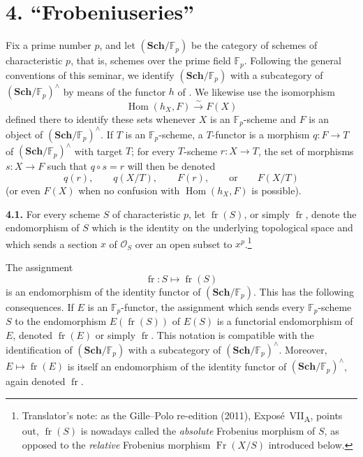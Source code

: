 
\section*{4. ``Frobeniuseries''}
\label{sga3:VIIA:4}

Fix a prime number \(p\), and let
\((\mathbf{Sch}/\mathbb F_p)\) be the category of schemes of
characteristic \(p\), that is, schemes over the prime field
\(\mathbb F_p\). Following the general conventions of this seminar,
we identify \((\mathbf{Sch}/\mathbb F_p)\) with a subcategory of
\((\mathbf{Sch}/\mathbb F_p)^\wedge\) by means of the functor \(h\)
of . We likewise use the isomorphism
\[
  \operatorname{Hom}(h_X,F)\xrightarrow{\sim}F(X)
\]
defined there to identify these sets whenever \(X\) is an
\(\mathbb F_p\)-scheme and \(F\) is an object of
\((\mathbf{Sch}/\mathbb F_p)^\wedge\). If \(T\) is an
\(\mathbb F_p\)-scheme, a \(T\)-functor is a morphism \(q:F\to T\) of
\((\mathbf{Sch}/\mathbb F_p)^\wedge\) with target \(T\); for every
\(T\)-scheme \(r:X\to T\), the set of morphisms \(s:X\to F\) such that
\(q\circ s=r\) will then be denoted
\[
  q(r),\qquad q(X/T),\qquad F(r),\qquad\text{or}\qquad F(X/T)
\]
(or even \(F(X)\) when no confusion with \(\operatorname{Hom}(h_X,F)\) is
possible).

\medskip
\noindent\textbf{4.1.}
\label{sga3:VIIA:4.1}
For every scheme \(S\) of characteristic \(p\), let
\(\operatorname{fr}(S)\), or simply \(\operatorname{fr}\), denote the
endomorphism of \(S\) which is the identity on the underlying
topological space and which sends a section \(x\) of \(\mathcal O_S\)
over an open subset to \(x^p\).\footnote{Translator's note: as the
Gille--Polo re-edition (2011), Expos\'e~VII\textsubscript{A}, points out,
\(\operatorname{fr}(S)\) is nowadays called the \emph{absolute} Frobenius
morphism of \(S\), as opposed to the \emph{relative} Frobenius morphism
\(\operatorname{Fr}(X/S)\) introduced below.}

The assignment
\[
  \operatorname{fr}:S\longmapsto\operatorname{fr}(S)
\]
is an endomorphism of the identity functor of
\((\mathbf{Sch}/\mathbb F_p)\).
This has the following consequences. If \(E\) is an
\(\mathbb F_p\)-functor, the assignment which sends every
\(\mathbb F_p\)-scheme \(S\) to the endomorphism
\(E(\operatorname{fr}(S))\) of \(E(S)\) is a functorial endomorphism
of \(E\), denoted \(\operatorname{fr}(E)\) or simply
\(\operatorname{fr}\). This notation is compatible with the
identification of \((\mathbf{Sch}/\mathbb F_p)\) with a subcategory
of \((\mathbf{Sch}/\mathbb F_p)^\wedge\). Moreover,
\(E\mapsto\operatorname{fr}(E)\) is itself an endomorphism of the
identity functor of \((\mathbf{Sch}/\mathbb F_p)^\wedge\), again
denoted \(\operatorname{fr}\).

